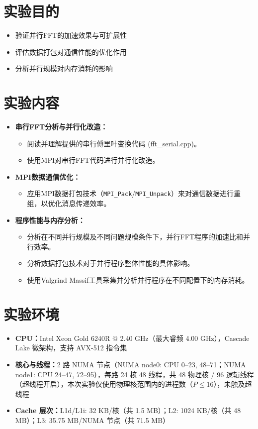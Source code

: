 \documentclass{SYSUReport}
\date{2026年5月18日}
\begin{document}
\cover
\thispagestyle{empty}
\clearpage

\section{实验目的}
\begin{itemize}
   \item 验证并行FFT的加速效果与可扩展性
   \item 评估数据打包对通信性能的优化作用
   \item 分析并行规模对内存消耗的影响
\end{itemize}

\section{实验内容}
\begin{itemize}
    \item \textbf{串行FFT分析与并行化改造：}
    \begin{itemize}
        \item 阅读并理解提供的串行傅里叶变换代码 (fft\_serial.cpp)。
        \item 使用MPI对串行FFT代码进行并行化改造。
    \end{itemize}
    \item \textbf{MPI数据通信优化：}
    \begin{itemize}
        \item 应用MPI数据打包技术（\texttt{MPI\_Pack}/\texttt{MPI\_Unpack}）来对通信数据进行重组，以优化消息传递效率。
    \end{itemize}
    \item \textbf{程序性能与内存分析：}
    \begin{itemize}
        \item 分析在不同并行规模及不同问题规模条件下，并行FFT程序的加速比和并行效率。
        \item 分析数据打包技术对于并行程序整体性能的具体影响。
        \item 使用Valgrind Massif工具采集并分析并行程序在不同配置下的内存消耗。
    \end{itemize}
\end{itemize}

\section{实验环境}
\begin{itemize}
    \item \textbf{CPU：}Intel Xeon Gold 6240R @ 2.40 GHz（最大睿频 4.00 GHz），Cascade Lake 微架构，支持 AVX-512 指令集
    \item \textbf{核心与线程：}2 路 NUMA 节点（NUMA node0: CPU 0--23, 48--71；NUMA node1: CPU 24--47, 72--95），每路 24 核 48 线程，共 48 物理核 / 96 逻辑线程（超线程开启），本次实验仅使用物理核范围内的进程数（$P \leq 16$），未触及超线程
    \item \textbf{Cache 层次：}L1d/L1i: 32 KB/核（共 1.5 MB）；L2: 1024 KB/核（共 48 MB）；L3: 35.75 MB/NUMA 节点（共 71.5 MB）
\end{itemize}
\end{document}
